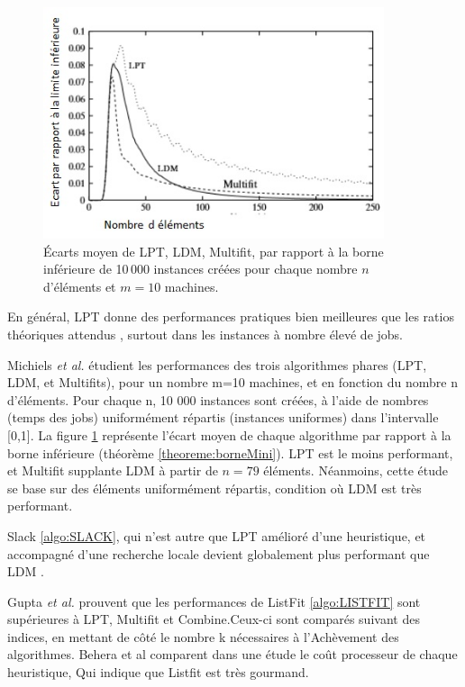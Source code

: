 \documentclass[a4paper,12pt]{report}
\theoremstyle{plain}				%
\theoremstyle{definition}				%
\begin{document}
\begin{figure}
\centering
\includegraphics[width=10cm,height=6.80cm]
{Biblio_PCmax_Rendu_CompborneInf_LPT_LDM_MULTIFIT.jpg}
\caption{Écarts moyen de LPT, LDM, Multifit, par rapport à la borne
  inférieure de 10\,000 instances créées pour chaque nombre $n$
  d'éléments et $m=10$ machines.}
\label{comparaison:LPTLDMMFBorneInf}
\end{figure}

En général, LPT donne des performances pratiques bien meilleures que les ratios théoriques attendus \cite{della2018longest}, surtout dans les instances à nombre élevé de jobs.

Michiels \emph{et al.} \citep{michiels2003performance} étudient les performances des trois algorithmes phares (LPT, LDM, et Multifits), pour un nombre m=10 machines, et en fonction du nombre n d'éléments. Pour chaque n, 10 000 instances sont créées, à l'aide de nombres (temps des jobs) uniformément répartis (instances uniformes) dans l'intervalle [0,1]. La figure \ref{comparaison:LPTLDMMFBorneInf} représente l'écart moyen de chaque algorithme
par rapport à la borne inférieure (théorème \ref{theoreme:borneMini}).
LPT est le moins performant, et Multifit supplante LDM à partir de $n=79$ éléments. Néanmoins, cette étude se base sur des éléments uniformément répartis, condition où LDM est très performant.

Slack \ref{algo:SLACK}, qui n'est autre que LPT amélioré d'une heuristique, et accompagné d'une recherche locale devient globalement plus performant que LDM \cite{della2018longest}.

Gupta \emph{et al.} prouvent que les performances de ListFit \ref{algo:LISTFIT} sont supérieures à LPT, Multifit et Combine.Ceux-ci sont comparés \cite{gupta2001listfit} \cite{lee1988multiprocessor} suivant des indices, en mettant de côté le nombre  k nécessaires à l’Achèvement des algorithmes. Behera et al \cite{behera2012comparison} comparent dans une étude le coût processeur de chaque heuristique, Qui indique que Listfit est très gourmand.
\end{document}

